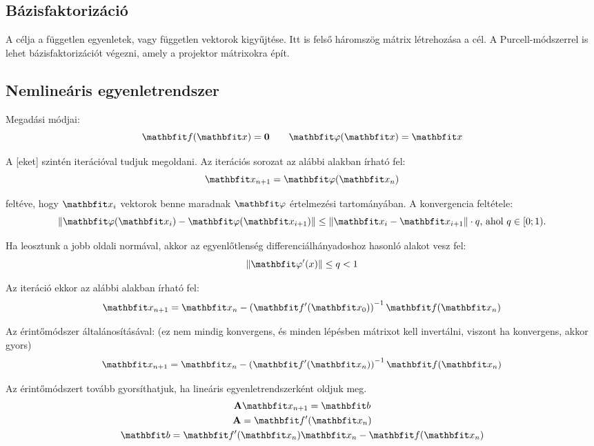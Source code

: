 \documentclass[../../main.tex]{subfiles}
\begin{document}
\subsection{Bázisfaktorizáció}

A  célja a független egyenletek, vagy független vektorok
kigyűjtése. Itt is felső háromszög mátrix létrehozása a cél. A Purcell-módszerrel
is lehet bázisfaktorizációt végezni, amely a projektor mátrixokra épít.

\subsection{Nemlineáris egyenletrendszer}

Megadási módjai:
\[
  \rvec f(\rvec x) = \mathbf{0}
  \qquad
  \rvec \varphi(\rvec x) = \rvec x
\]

A [eket] szintén iterációval tudjuk megoldani.
Az iterációs sorozat az alábbi alakban írható fel:
\[
  \rvec x_{n+1} = \rvec \varphi(\rvec x_n)
\]

feltéve, hogy $\rvec x_i$ vektorok benne maradnak $\rvec
  \varphi$ értelmezési tartományában. A konvergencia feltétele:
\[
  \left\| \rvec \varphi(\rvec x_i) - \rvec \varphi(\rvec x_{i+1}) \right\|
  \leq \left\| \rvec x_i - \rvec x_{i+1} \right\| \cdot q
  \text{, ahol } q \in [0; 1).
\]

Ha leosztunk a jobb oldali normával, akkor az egyenlőtlenség
differenciálhányadoshoz hasonló alakot vesz fel:
\[
  \left\| \rvec \varphi'(x) \right\| \leq q < 1
\]

Az iteráció ekkor az alábbi alakban írható fel:
\[
  \rvec x_{n+1}
  = \rvec x_n
  - \left( \rvec f'(\rvec x_0) \right)^{-1} \rvec f(\rvec x_n)
\]

Az érintőmódszer általánosításával: (ez nem mindig konvergens, és minden
lépésben mátrixot kell invertálni, viszont ha konvergens, akkor gyors)
\[
  \rvec x_{n+1}
  = \rvec x_n
  - \left( \rvec f'(\rvec x_n) \right)^{-1} \rvec f(\rvec x_n)
\]

Az érintőmódszert tovább gyorsíthatjuk, ha lineáris egyenletrendszerként oldjuk
meg.
\begin{gather*}
  \rmat A \rvec x_{n+1} = \rvec b \\
  \rmat A = \rvec f'(\rvec x_n)   \\
  \rvec b = \rvec f'(\rvec x_n) \rvec x_n - \rvec f(\rvec x_n)
\end{gather*}
\end{document}

